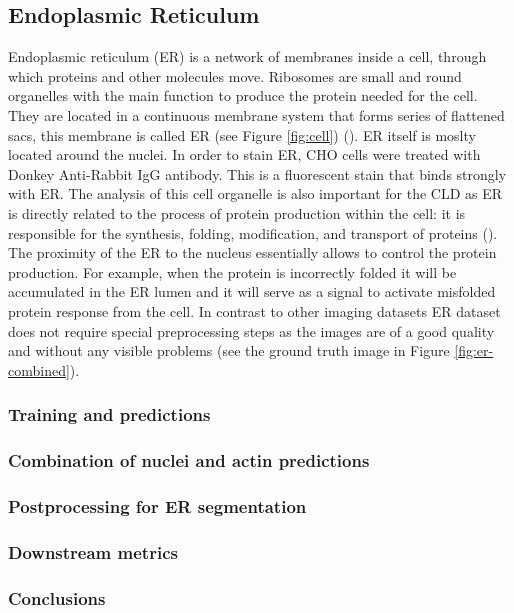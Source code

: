 \subsection{Endoplasmic Reticulum}
    Endoplasmic reticulum (ER) is a network of membranes inside a cell, through which proteins and other molecules move. Ribosomes are small and round organelles with the main function to produce the protein needed for the cell. They are located in a continuous membrane system that forms series of flattened sacs, this membrane is called ER (see Figure \ref{fig:cell}) (\cite{er}). ER itself is moslty located around the nuclei. In order to stain ER, CHO cells were treated with Donkey Anti-Rabbit IgG antibody. This is a fluorescent stain that binds strongly with ER. The analysis of this cell organelle is also important for the CLD as ER is directly related to the process of protein production within the cell: it is responsible for the synthesis, folding, modification, and transport of proteins (\cite{er_2}). The proximity of the ER to the nucleus essentially allows to control the protein production. For example, when the protein is incorrectly folded it will be accumulated in the ER lumen and it will serve as a signal to activate misfolded protein response from the cell. In contrast to other imaging datasets ER dataset does not require special preprocessing steps as the images are of a good quality and without any visible problems (see the ground truth image in Figure \ref{fig:er-combined}).
    
    \subsubsection{Training and predictions}
        
    \subsubsection{Combination of nuclei and actin predictions}
        
    \subsubsection{Postprocessing for ER segmentation}
        
    \subsubsection{Downstream metrics}
        
    \subsubsection{Conclusions}
        
    